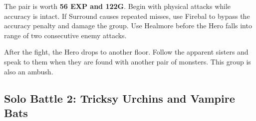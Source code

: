 \documentclass[
  american,
  10pt,
  letterpaper,
  oneside,
  open=any]{scrreprt}
\newenvironment{guidetable}{%
  \small\setstretch{1.0}%
  \setlength{\tabcolsep}{4pt}%
  \setlength{\LTpre}{8pt}\setlength{\LTpost}{10pt}%
  \renewcommand{\arraystretch}{1.16}%
}{ }
\begin{document}
The pair is worth \textbf{56 EXP and 122G}. Begin with physical attacks
while accuracy is intact. If Surround causes repeated misses, use
Firebal to bypass the accuracy penalty and damage the group. Use
Healmore before the Hero falls into range of two consecutive enemy
attacks.

After the fight, the Hero drops to another floor. Follow the apparent
sisters and speak to them when they are found with another pair of
monsters. This group is also an ambush.

\begin{landscape}

\subsection{Solo Battle 2: Tricksy Urchins and Vampire
Bats}\label{solo-battle-2-tricksy-urchins-and-vampire-bats}

\begin{guidetable}


\end{guidetable}
\end{landscape}
\end{document}
